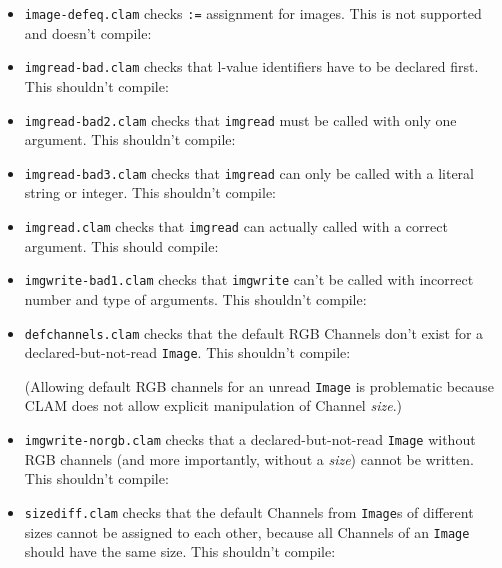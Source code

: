 \begin{itemize}
\item\texttt{image-defeq.clam} checks \texttt{:=} assignment for images. This is not supported and doesn't compile:


\item\texttt{imgread-bad.clam} checks that l-value identifiers have to be declared first. This shouldn't compile:


\item\texttt{imgread-bad2.clam} checks that \texttt{imgread} must be called with only one argument. This shouldn't compile:


\item\texttt{imgread-bad3.clam} checks that \texttt{imgread} can only be called with a literal string or integer. This shouldn't compile:


\item\texttt{imgread.clam} checks that \texttt{imgread} can actually called with a correct argument. This should compile:


\item\texttt{imgwrite-bad1.clam} checks that \texttt{imgwrite} can't be called with incorrect number and type of arguments. This shouldn't compile:


\item\texttt{defchannels.clam} checks that the default RGB Channels don't exist for a declared-but-not-read \texttt{Image}. This shouldn't compile:

(Allowing default RGB channels for an unread \texttt{Image} is problematic because CLAM
does not allow explicit manipulation of Channel \emph{size}.)

\item\texttt{imgwrite-norgb.clam} checks that a declared-but-not-read \texttt{Image} without RGB channels
(and more importantly, without a \emph{size}) cannot be written. This shouldn't compile:


\item\texttt{sizediff.clam} checks that the default Channels from \texttt{Image}s of different sizes
cannot be assigned to each other, because all Channels of an \texttt{Image} should have the same size. This shouldn't compile:



\end{itemize}
